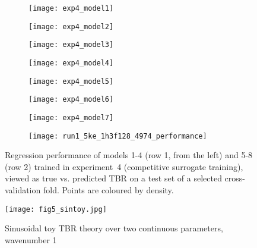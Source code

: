 \begin{figure}[h]
	\centering
	\begin{subfigure}[b]{0.25\textwidth}
		\centering
		\texttt{[image: exp4\_model1]}
	\end{subfigure}\hfill%
	\begin{subfigure}[b]{0.25\textwidth}
		\centering
		\texttt{[image: exp4\_model2]}
	\end{subfigure}\hfill%
	\begin{subfigure}[b]{0.25\textwidth}
		\centering
		\texttt{[image: exp4\_model3]}
	\end{subfigure}\hfill%
	\begin{subfigure}[b]{0.25\textwidth}
		\centering
		\texttt{[image: exp4\_model4]}
	\end{subfigure}

	\begin{subfigure}[b]{0.25\textwidth}
		\centering
		\texttt{[image: exp4\_model5]}
	\end{subfigure}\hfill%
	\begin{subfigure}[b]{0.25\textwidth}
		\centering
		\texttt{[image: exp4\_model6]}
	\end{subfigure}\hfill%
	\begin{subfigure}[b]{0.25\textwidth}
		\centering
		\texttt{[image: exp4\_model7]}
	\end{subfigure}\hfill%
	\begin{subfigure}[b]{0.25\textwidth}
		\centering
		\texttt{[image: run1\_5ke\_1h3f128\_4974\_performance]}
	\end{subfigure}
	\caption{Regression performance of models 1-4 (row 1, from the left) and 5-8
		(row 2) trained in experiment~4 (competitive surrogate training), viewed
		as true vs. predicted TBR on a test set of a selected cross-validation
		fold. Points are coloured by density.}
	\label{fig:reg-performance}
\end{figure}

\newpage

\begin{wrapfigure}{r}{0.4\textwidth}
  \vspace{-60pt}
  \begin{center}
    \texttt{[image: fig5\_sintoy.jpg]}
	\caption{Sinusoidal toy TBR theory over two continuous parameters, wavenumber 1}
    \label{fig:sintoy}
  \end{center}
  \vspace{-10pt}
\end{wrapfigure}

